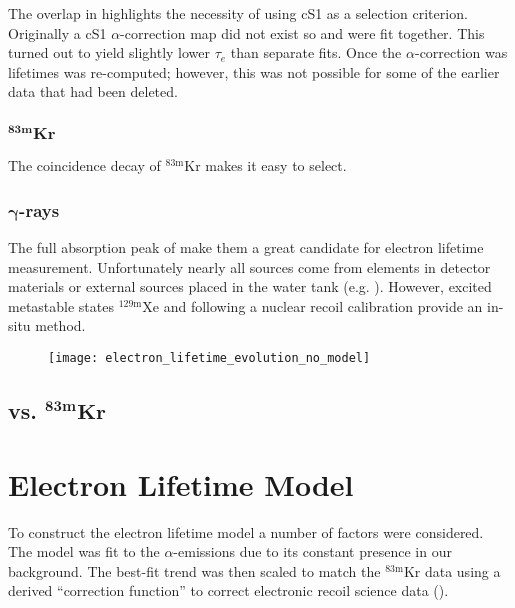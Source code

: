 The overlap in \stwob highlights the necessity of using cS1 as a selection criterion.  Originally a cS1 $\alpha$-correction map did not
exist so  and  were fit together.  This turned out to yield slightly lower $\tau_e$ than separate fits.  Once
the $\alpha$-correction was lifetimes was re-computed; however, this was not possible for some of the earlier data that had been
deleted.


\subsubsection{$\mathbf{^{83m}Kr}$}
\label{subsubsec:electron_lifetimes_measurement_kr}
The coincidence decay of $\mathrm{^{83m}Kr}$ makes it easy to select.



\subsubsection{$\mathbf{\gamma}$-rays}
\label{subsec:electron_lifetimes_measurement_gammas}
The full absorption peak of \gammarays make them a great candidate for electron lifetime measurement.  Unfortunately nearly all
\gammaray sources come from elements in detector materials or external sources placed in the water tank (e.g. ).  However,
excited metastable states $\mathrm{^{129m}Xe}$ and \meta[131][xe] following a nuclear recoil calibration provide an in-situ method.

\begin{figure}
\centering
\texttt{[image: electron\_lifetime\_evolution\_no\_model]}
\caption{}
\label{fig:electron_lifetimes_evolution_no_model}
\end{figure}




\subsection{ vs. $\mathbf{^{83m}Kr}$}
\label{subsec:electron_lifetimes_rn222_vs_kr83m}



\section{Electron Lifetime Model}
\label{sec:electron_lifetime_model}
To construct the electron lifetime model a number of factors were considered.  The model was fit to the  $\alpha$-emissions
due to its constant presence in our background.  The best-fit trend was then scaled to match the $\mathrm{^{83m}Kr}$ data using a derived
``correction function'' to correct electronic recoil science data ().



